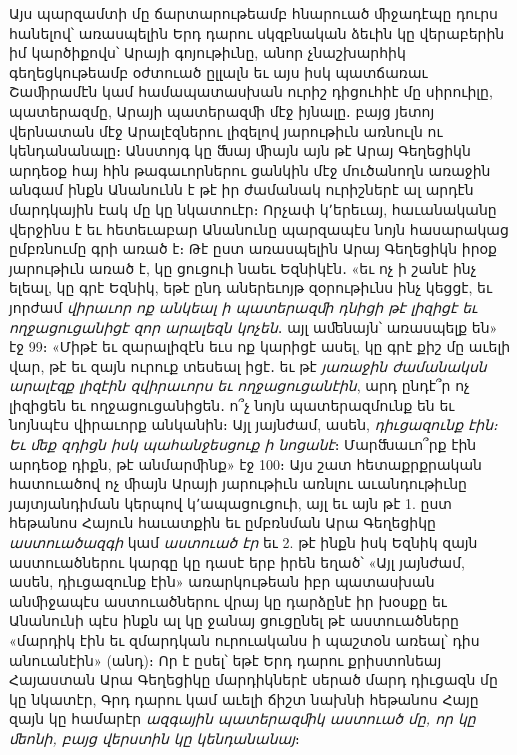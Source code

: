 \documentclass{article}
\begin{document}
{Այս պարզամտի մը ճարտարութեամբ հնարուած ﬕջադէպը դուրս հանելով՝ առասպելին Երդ դարու սկզբնական ձեւին կը վերաբերին իմ կարծիքովս՝ Արայի գոյութիւնը, անոր չնաշխարհիկ գեղեցկութեամբ օժտուած ըլլալն եւ այս իսկ պատճառաւ Շաﬕրամէն կամ համապատասխան ուրիշ դիցուհիէ մը սիրուիլը, պատերազմը, Արայի պատերազﬕ մէջ իյնալը․ բայց յետոյ վերնատան մէջ Արալէզներու լիզելով յարութիւն առնուլն ու կենդանանալը։ Անստոյգ կը ﬓայ ﬕայն այն թէ Արայ Գեղեցիկն արդեօք հայ հին թագաւորներու ցանկին մէջ մուծանողն առաջին անգամ ինքն Անանունն է թէ իր ժամանակ ուրիշներէ ալ արդէն մարդկային էակ մը կը նկատուէր։ Որչափ կ՚երեւայ, հաւանականը վերջինս է եւ հետեւաբար Անանունը պարզապէս նոյն հասարակաց ըմբռնումը գրի առած է։ Թէ ըստ առասպելին Արայ Գեղեցիկն իրօք յարութիւն առած է, կը ցուցուի նաեւ Եզնիկէն․ «եւ ոչ ի շանէ ինչ ելեալ, կը գրէ Եզնիկ, եթէ ընդ աներեւոյթ զօրութիւնս ինչ կեցցէ, եւ յորժամ \emph{վիրաւոր ոք անկեալ ի պատերազﬕ դնիցի թէ լիզիցէ եւ ողջացուցանիցէ զոր արալեզն կոչեն}․ այլ աﬔնայն՝ առասպելք են» էջ 99։ «Միթէ եւ զարալիզէն եւս ոք կարիցէ ասել, կը գրէ քիշ մը աւելի վար, թէ եւ զայն ուրուք տեսեալ իցէ․ եւ թէ \emph{յառաջին ժամանակսն արալէզք լիզէին զվիրաւորս եւ ողջացուցանէին}, արդ ընդէ՞ր ոչ լիզիցեն եւ ողջացուցանիցեն․ ո՞չ նոյն պատերազմունք են եւ նոյնպէս վիրաւորք անկանին։ Այլ յայնժամ, ասեն, \emph{դիւցազունք էին։ Եւ ﬔք զդիցն իսկ պահանջեսցուք ի նոցանէ}։ Մարﬓաւո՞րք էին արդեօք դիքն, թէ անմարﬕնք» էջ 100։ Այս շատ հետաքրքրական հատուածով ոչ ﬕայն Արայի յարութիւն առնլու աւանդութիւնը յայտյանդիման կերպով կ՚ապացուցուի, այլ եւ այն թէ 1. ըստ հեթանոս Հայուն հաւատքին եւ ըմբռնման Արա Գեղեցիկը \emph{աստուածազգի} կամ \emph{աստուած էր} եւ 2. թէ ինքն իսկ Եզնիկ զայն աստուածներու կարգը կը դասէ երբ իրեն եղած՝ «Այլ յայնժամ, ասեն, դիւցազունք էին» առարկութեան իբր պատասխան անﬕջապէս աստուածներու վրայ կը դարձընէ իր խօսքը եւ Անանունի պէս ինքն ալ կը ջանայ ցուցընել թէ աստուածները «մարդիկ էին եւ զմարդկան ուրուականս ի պաշտօն առեալ՝ դիս անուանէին» (անդ)։ Որ է ըսել՝ եթէ Երդ դարու քրիստոնեայ Հայաստան Արա Գեղեցիկը մարդիկներէ սերած մարդ դիւցազն մը կը նկատէր, Գրդ դարու կամ աւելի ճիշտ նախնի հեթանոս Հայը զայն կը համարէր \emph{ազգային պատերազﬕկ աստուած մը, որ կը ﬔոնի, բայց վերստին կը կենդանանայ}։}
\clearpage
\subsection{}
\end{document}
